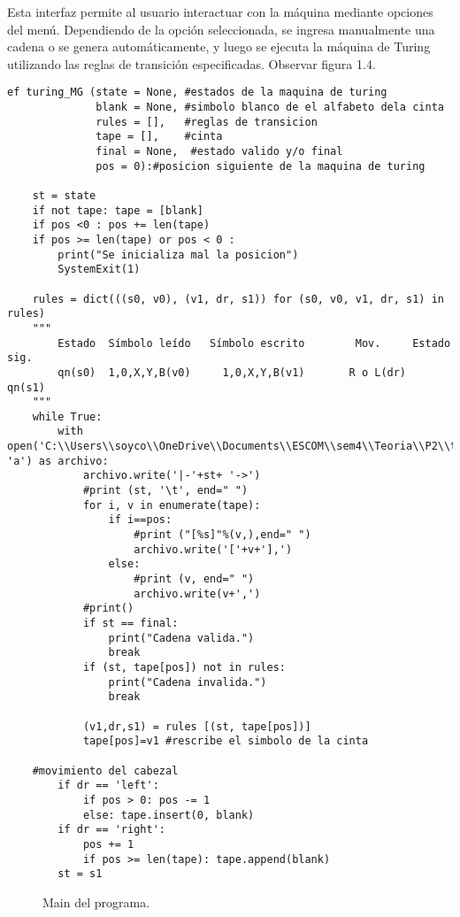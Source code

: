 Esta interfaz permite al usuario interactuar con la máquina mediante opciones del menú. Dependiendo de la opción seleccionada, se ingresa manualmente una cadena o se genera automáticamente, y luego se ejecuta la máquina de Turing utilizando las reglas de transición especificadas.  Observar figura 1.4.\newline

\begin{lstlisting}
ef turing_MG (state = None, #estados de la maquina de turing
              blank = None, #simbolo blanco de el alfabeto dela cinta
              rules = [],   #reglas de transicion
              tape = [],    #cinta
              final = None,  #estado valido y/o final
              pos = 0):#posicion siguiente de la maquina de turing

    st = state
    if not tape: tape = [blank]
    if pos <0 : pos += len(tape)
    if pos >= len(tape) or pos < 0 : 
        print("Se inicializa mal la posicion")
        SystemExit(1)
    
    rules = dict(((s0, v0), (v1, dr, s1)) for (s0, v0, v1, dr, s1) in rules)
    """
        Estado	Símbolo leído	Símbolo escrito	       Mov. 	Estado sig.
        qn(s0)  1,0,X,Y,B(v0)	  1,0,X,Y,B(v1)       R o L(dr)	   qn(s1)
    """
    while True:
        with open('C:\\Users\\soyco\\OneDrive\\Documents\\ESCOM\\sem4\\Teoria\\P2\\turing\\output\\turing.txt', 'a') as archivo:
            archivo.write('|-'+st+ '->')
            #print (st, '\t', end=" ")
            for i, v in enumerate(tape):
                if i==pos: 
                    #print ("[%s]"%(v,),end=" ")
                    archivo.write('['+v+'],')
                else: 
                    #print (v, end=" ")
                    archivo.write(v+',') 
            #print()
            if st == final: 
                print("Cadena valida.")
                break
            if (st, tape[pos]) not in rules: 
                print("Cadena invalida.")
                break
            
            (v1,dr,s1) = rules [(st, tape[pos])]
            tape[pos]=v1 #rescribe el simbolo de la cinta
    
    #movimiento del cabezal
        if dr == 'left':
            if pos > 0: pos -= 1
            else: tape.insert(0, blank)
        if dr == 'right':
            pos += 1
            if pos >= len(tape): tape.append(blank)
        st = s1

\end{lstlisting}
\begin{figure}[h]
\begin{center}
\end{center}
\caption{Main del programa.}
\label{fig:imagen}
\end{figure}
